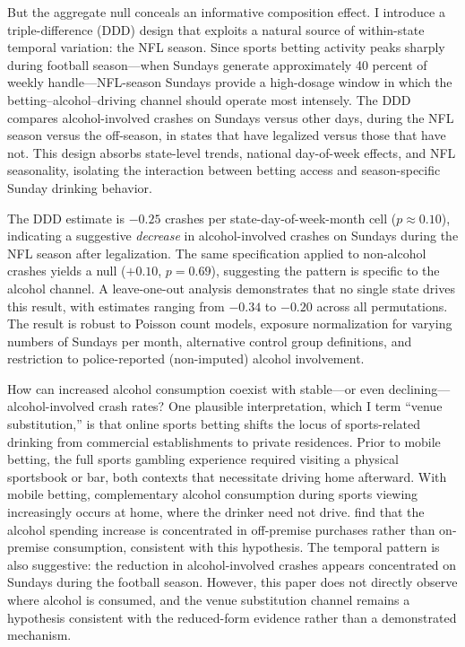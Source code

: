 \documentclass[12pt]{article}
\begin{document}
But the aggregate null conceals an informative composition effect. I introduce a triple-difference (DDD) design that exploits a natural source of within-state temporal variation: the NFL season. Since sports betting activity peaks sharply during football season---when Sundays generate approximately 40 percent of weekly handle---NFL-season Sundays provide a high-dosage window in which the betting--alcohol--driving channel should operate most intensely. The DDD compares alcohol-involved crashes on Sundays versus other days, during the NFL season versus the off-season, in states that have legalized versus those that have not. This design absorbs state-level trends, national day-of-week effects, and NFL seasonality, isolating the interaction between betting access and season-specific Sunday drinking behavior.

The DDD estimate is $-0.25$ crashes per state-day-of-week-month cell ($p \approx 0.10$), indicating a suggestive \emph{decrease} in alcohol-involved crashes on Sundays during the NFL season after legalization. The same specification applied to non-alcohol crashes yields a null ($+0.10$, $p = 0.69$), suggesting the pattern is specific to the alcohol channel. A leave-one-out analysis demonstrates that no single state drives this result, with estimates ranging from $-0.34$ to $-0.20$ across all permutations. The result is robust to Poisson count models, exposure normalization for varying numbers of Sundays per month, alternative control group definitions, and restriction to police-reported (non-imputed) alcohol involvement.

How can increased alcohol consumption coexist with stable---or even declining---alcohol-involved crash rates? One plausible interpretation, which I term ``venue substitution,'' is that online sports betting shifts the locus of sports-related drinking from commercial establishments to private residences. Prior to mobile betting, the full sports gambling experience required visiting a physical sportsbook or bar, both contexts that necessitate driving home afterward. With mobile betting, complementary alcohol consumption during sports viewing increasingly occurs at home, where the drinker need not drive. \citet{taylor2024betting} find that the alcohol spending increase is concentrated in off-premise purchases rather than on-premise consumption, consistent with this hypothesis. The temporal pattern is also suggestive: the reduction in alcohol-involved crashes appears concentrated on Sundays during the football season. However, this paper does not directly observe where alcohol is consumed, and the venue substitution channel remains a hypothesis consistent with the reduced-form evidence rather than a demonstrated mechanism.
\end{document}
